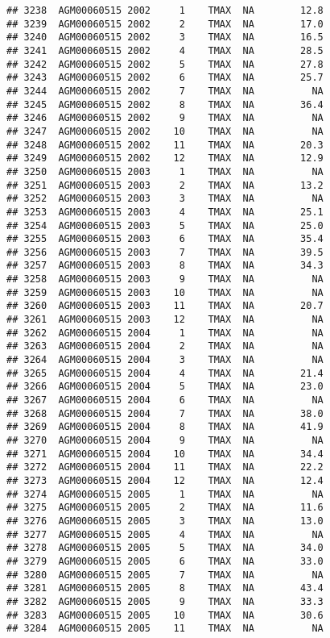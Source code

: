 \documentclass{article}\usepackage[]{graphicx}\usepackage[]{color}
\makeatletter
\newenvironment{kframe}{%
 \def\at@end@of@kframe{}%
 \ifinner\ifhmode%
  \def\at@end@of@kframe{\end{minipage}}%
  \begin{minipage}{\columnwidth}%
 \fi\fi%
 \def\FrameCommand##1{\hskip\@totalleftmargin \hskip-\fboxsep
 \colorbox{shadecolor}{##1}\hskip-\fboxsep
     \hskip-\linewidth \hskip-\@totalleftmargin \hskip\columnwidth}%
 \MakeFramed {\advance\hsize-\width
   \@totalleftmargin\z@ \linewidth\hsize
   \@setminipage}}%
 {\par\unskip\endMakeFramed%
 \at@end@of@kframe}
\newenvironment{knitrout}{}{} %
\makeatother
\begin{document}
\begin{knitrout}
\begin{kframe}
\begin{verbatim}
## 3238  AGM00060515 2002     1    TMAX  NA        12.8
## 3239  AGM00060515 2002     2    TMAX  NA        17.0
## 3240  AGM00060515 2002     3    TMAX  NA        16.5
## 3241  AGM00060515 2002     4    TMAX  NA        28.5
## 3242  AGM00060515 2002     5    TMAX  NA        27.8
## 3243  AGM00060515 2002     6    TMAX  NA        25.7
## 3244  AGM00060515 2002     7    TMAX  NA          NA
## 3245  AGM00060515 2002     8    TMAX  NA        36.4
## 3246  AGM00060515 2002     9    TMAX  NA          NA
## 3247  AGM00060515 2002    10    TMAX  NA          NA
## 3248  AGM00060515 2002    11    TMAX  NA        20.3
## 3249  AGM00060515 2002    12    TMAX  NA        12.9
## 3250  AGM00060515 2003     1    TMAX  NA          NA
## 3251  AGM00060515 2003     2    TMAX  NA        13.2
## 3252  AGM00060515 2003     3    TMAX  NA          NA
## 3253  AGM00060515 2003     4    TMAX  NA        25.1
## 3254  AGM00060515 2003     5    TMAX  NA        25.0
## 3255  AGM00060515 2003     6    TMAX  NA        35.4
## 3256  AGM00060515 2003     7    TMAX  NA        39.5
## 3257  AGM00060515 2003     8    TMAX  NA        34.3
## 3258  AGM00060515 2003     9    TMAX  NA          NA
## 3259  AGM00060515 2003    10    TMAX  NA          NA
## 3260  AGM00060515 2003    11    TMAX  NA        20.7
## 3261  AGM00060515 2003    12    TMAX  NA          NA
## 3262  AGM00060515 2004     1    TMAX  NA          NA
## 3263  AGM00060515 2004     2    TMAX  NA          NA
## 3264  AGM00060515 2004     3    TMAX  NA          NA
## 3265  AGM00060515 2004     4    TMAX  NA        21.4
## 3266  AGM00060515 2004     5    TMAX  NA        23.0
## 3267  AGM00060515 2004     6    TMAX  NA          NA
## 3268  AGM00060515 2004     7    TMAX  NA        38.0
## 3269  AGM00060515 2004     8    TMAX  NA        41.9
## 3270  AGM00060515 2004     9    TMAX  NA          NA
## 3271  AGM00060515 2004    10    TMAX  NA        34.4
## 3272  AGM00060515 2004    11    TMAX  NA        22.2
## 3273  AGM00060515 2004    12    TMAX  NA        12.4
## 3274  AGM00060515 2005     1    TMAX  NA          NA
## 3275  AGM00060515 2005     2    TMAX  NA        11.6
## 3276  AGM00060515 2005     3    TMAX  NA        13.0
## 3277  AGM00060515 2005     4    TMAX  NA          NA
## 3278  AGM00060515 2005     5    TMAX  NA        34.0
## 3279  AGM00060515 2005     6    TMAX  NA        33.0
## 3280  AGM00060515 2005     7    TMAX  NA          NA
## 3281  AGM00060515 2005     8    TMAX  NA        43.4
## 3282  AGM00060515 2005     9    TMAX  NA        33.3
## 3283  AGM00060515 2005    10    TMAX  NA        30.6
## 3284  AGM00060515 2005    11    TMAX  NA          NA

\end{verbatim}
\end{kframe}
\end{knitrout}
\end{document}
